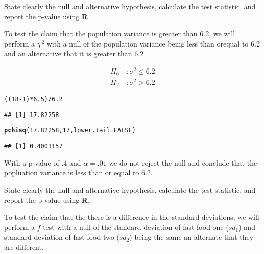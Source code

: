 \documentclass[12pt]{article}\usepackage[]{graphicx}\usepackage[]{color}
\makeatletter
\newcommand{\hlnum}[1]{\textcolor[rgb]{0.686,0.059,0.569}{#1}}%
\newcommand{\hlopt}[1]{\textcolor[rgb]{0,0,0}{#1}}%
\newcommand{\hlstd}[1]{\textcolor[rgb]{0.345,0.345,0.345}{#1}}%
\newcommand{\hlkwc}[1]{\textcolor[rgb]{0.333,0.667,0.333}{#1}}%
\newcommand{\hlkwd}[1]{\textcolor[rgb]{0.737,0.353,0.396}{\textbf{#1}}}%
\newenvironment{kframe}{%
 \def\at@end@of@kframe{}%
 \ifinner\ifhmode%
  \def\at@end@of@kframe{\end{minipage}}%
  \begin{minipage}{\columnwidth}%
 \fi\fi%
 \def\FrameCommand##1{\hskip\@totalleftmargin \hskip-\fboxsep
 \colorbox{shadecolor}{##1}\hskip-\fboxsep
     \hskip-\linewidth \hskip-\@totalleftmargin \hskip\columnwidth}%
 \MakeFramed {\advance\hsize-\width
   \@totalleftmargin\z@ \linewidth\hsize
   \@setminipage}}%
 {\par\unskip\endMakeFramed%
 \at@end@of@kframe}
\newenvironment{knitrout}{}{} %
\newenvironment{exercise}[2][Exercise]{\begin{trivlist}
\item[\hskip \labelsep {\bfseries #1}\hskip \labelsep {\bfseries #2.}]}{\end{trivlist}}
\newenvironment{Answer}[2][Answer]{\begin{trivlist}
\item[\hskip \labelsep {\bfseries #1}\hskip \labelsep {\bfseries #2.}]}{\end{trivlist}}
\makeatother
\begin{document}
\begin{Answer}{2}
\begin{exercise}{3} State clearly the null and alternative hypothesis, calculate the test statistic, and report the p-value using \textbf{R}
\end{exercise}

\begin{Answer}{3}

To test the claim that the population variance is greater than 6.2, we will perform a $\chi^{2}$ with a null of the population variance being less than orequal to 6.2 and an alternative that it is greater than 6.2

\begin{align}
H_0&:\sigma^{2}\leq{6.2}\\
H_A&:\sigma^{2}>6.2
\end{align}

\begin{knitrout}
\color{fgcolor}\begin{kframe}
\begin{alltt}
\hlstd{((}\hlnum{18}\hlopt{-}\hlnum{1}\hlstd{)}\hlopt{*}\hlnum{6.5}\hlstd{)}\hlopt{/}\hlnum{6.2}
\end{alltt}
\begin{verbatim}
## [1] 17.82258
\end{verbatim}
\begin{alltt}
\hlkwd{pchisq}\hlstd{(}\hlnum{17.82258}\hlstd{,}\hlnum{17}\hlstd{,}\hlkwc{lower.tail}\hlstd{=}\hlnum{FALSE}\hlstd{)}
\end{alltt}
\begin{verbatim}
## [1] 0.4001157
\end{verbatim}
\end{kframe}
\end{knitrout}
With a p-value of .4 and $\alpha=.01$ we do not reject the null and conclude that the popluation variance is less than or equal to 6.2.
\end{Answer}

\begin{exercise}{4} State clearly the null and alternative hypothesis, calculate the test statistic, and report the p-value using \textbf{R}.
\end{exercise}

\begin{Answer}{4}
To test the claim that the there is a difference in the standard deviations, we will perform a $f$ test with a null of the standard deviation of fast food one ($sd_1$) and standard deviation of fast food two ($sd_2$) being the same an alternate that they are different.


\end{Answer}
\end{Answer}
\end{document}
